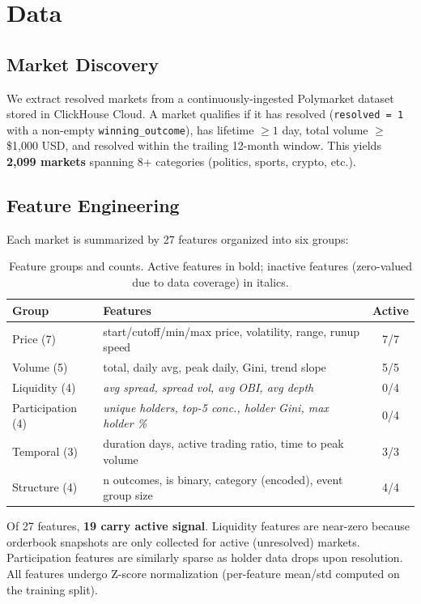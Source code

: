 \documentclass[11pt,a4paper]{article}
\begin{document}
\section{Data}

\subsection{Market Discovery}

We extract resolved markets from a continuously-ingested Polymarket dataset stored in ClickHouse Cloud. A market qualifies if it has resolved (\texttt{resolved = 1} with a non-empty \texttt{winning\_outcome}), has lifetime $\geq 1$ day, total volume $\geq$ \$1,000 USD, and resolved within the trailing 12-month window. This yields \textbf{2,099 markets} spanning 8+ categories (politics, sports, crypto, etc.).

\subsection{Feature Engineering}

Each market is summarized by 27 features organized into six groups:

\begin{table}[H]
\centering
\caption{Feature groups and counts. Active features in bold; inactive features (zero-valued due to data coverage) in italics.}
\label{tab:features}
\begin{tabular}{@{}llc@{}}
\toprule
\textbf{Group} & \textbf{Features} & \textbf{Active} \\
\midrule
Price (7) & start/cutoff/min/max price, volatility, range, runup speed & 7/7 \\
Volume (5) & total, daily avg, peak daily, Gini, trend slope & 5/5 \\
Liquidity (4) & \textit{avg spread, spread vol, avg OBI, avg depth} & 0/4 \\
Participation (4) & \textit{unique holders, top-5 conc., holder Gini, max holder \%} & 0/4 \\
Temporal (3) & duration days, active trading ratio, time to peak volume & 3/3 \\
Structure (4) & n outcomes, is binary, category (encoded), event group size & 4/4 \\
\bottomrule
\end{tabular}
\end{table}

Of 27 features, \textbf{19 carry active signal}. Liquidity features are near-zero because orderbook snapshots are only collected for active (unresolved) markets. Participation features are similarly sparse as holder data drops upon resolution. All features undergo Z-score normalization (per-feature mean/std computed on the training split).
\end{document}
